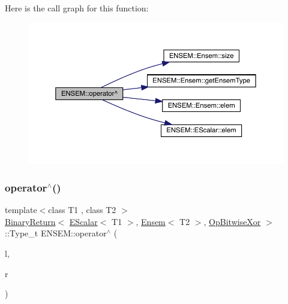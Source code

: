 Here is the call graph for this function\+:\nopagebreak
\begin{figure}[H]
\begin{center}
\leavevmode
\includegraphics[width=350pt]{d1/d9e/group__eensem_ga6558c3ffb3c2fcd52505cddbc3c0b310_cgraph}
\end{center}
\end{figure}
\mbox{\label{group__eensem_gac576149a62d51c7020e2452341351129}} 
\subsubsection{\texorpdfstring{operator$^\wedge$()}{operator^()}\hspace{0.1cm}{\footnotesize\ttfamily [3/3]}}
{\footnotesize\ttfamily template$<$class T1 , class T2 $>$ \\
\mbox{\hyperlink{structENSEM_1_1BinaryReturn}{Binary\+Return}}$<$ \mbox{\hyperlink{classENSEM_1_1EScalar}{E\+Scalar}}$<$ T1 $>$, \mbox{\hyperlink{classENSEM_1_1Ensem}{Ensem}}$<$ T2 $>$, \mbox{\hyperlink{structENSEM_1_1OpBitwiseXor}{Op\+Bitwise\+Xor}} $>$\+::Type\+\_\+t E\+N\+S\+E\+M\+::operator$^\wedge$ (\begin{DoxyParamCaption}\item[{const \mbox{\hyperlink{classENSEM_1_1EScalar}{E\+Scalar}}$<$ T1 $>$ \&}]{l,  }\item[{const \mbox{\hyperlink{classENSEM_1_1Ensem}{Ensem}}$<$ T2 $>$ \&}]{r }\end{DoxyParamCaption})\hspace{0.3cm}{\ttfamily [inline]}}

